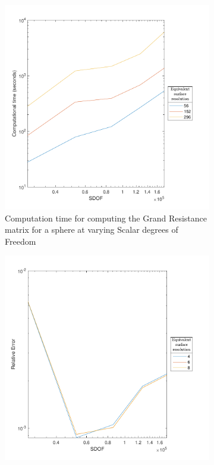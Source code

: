 \begin{figure}[ht]
     \centering
     \begin{subfigure}[b]{0.49\textwidth}
         \centering
         \includegraphics[width=\textwidth]{Images/KIFMM/Graphs/QuadPointsTime.pdf}
         \caption{Computation time for computing the Grand Resistance matrix for a sphere at varying Scalar degrees of Freedom}
         \label{fig:QuadPointsTime}
     \end{subfigure}
     \hfill
     \begin{subfigure}[b]{0.49\textwidth}
         \centering
         \includegraphics[width=\textwidth]{Images/KIFMM/Graphs/QuadPointsError.pdf}

\end{subfigure}
\end{figure}
